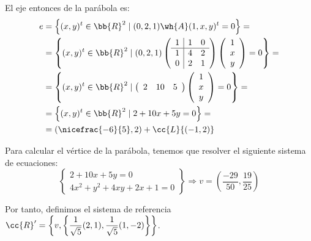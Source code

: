 \begin{ejercicio}
\begin{enumerate}
        El eje entonces de la parábola es:
        \begin{equation*}
            \begin{split}
                e&=\left\{(x,y)^t\in \bb{R}^2 \mid (0,2,1)\wh{A}(1,x,y)^t=0\right\}=\\
                &= \left\{(x,y)^t\in \bb{R}^2 \mid (0,2,1) \left(\begin{array}{c|cc}
                1 & 1 & 0  \\ \hline
                1 & 4 & 2 \\
                0 &  2 & 1
            \end{array}\right)
             \left(\begin{array}{c}
                1 \\
                x \\
                y
            \end{array}\right)
            =0\right\} =\\
            &= \left\{(x,y)^t\in \bb{R}^2 \mid \left(\begin{array}{ccc}
                2 & 10 & 5
            \end{array}\right)
             \left(\begin{array}{c}
                1 \\
                x \\
                y
            \end{array}\right)
            =0\right\} =\\
            &= \left\{(x,y)^t\in \bb{R}^2 \mid 2+10x+5y=0\right\} =\\
            &= \left(\nicefrac{-6}{5}, 2\right)+\cc{L}\{(-1,2)\}
            \end{split}
        \end{equation*}

        Para calcular el vértice de la parábola, tenemos que resolver el siguiente sistema de ecuaciones:
        \begin{equation*}
            \left\{
            \begin{array}{l}
                2+10x+5y=0 \\
                4x^2+y^2+4xy+2x+1=0
            \end{array}
            \right\}\Longrightarrow v=\left(\frac{-29}{50},\frac{19}{25}\right)
        \end{equation*}

        Por tanto, definimos el sistema de referencia $\cc{R}'=\left\{v, \left\{\dfrac{1}{\sqrt{5}}(2,1), \dfrac{1}{\sqrt{5}}(1,-2)\right\}\right\}$.


\end{enumerate}
\end{ejercicio}
